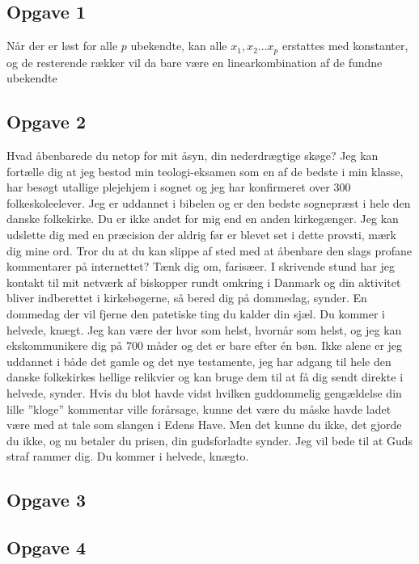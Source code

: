 \documentclass[../main.tex]{subfiles} %
\begin{document}
	
\subsection{Opgave 1}
Når der er løst for alle $p$ ubekendte, kan alle $x_1, x_2... x_p$ erstattes med konstanter, og de resterende rækker vil da bare være en linearkombination af de fundne ubekendte

\subsection{Opgave 2}
Hvad åbenbarede du netop for mit åsyn, din nederdrægtige skøge? Jeg kan fortælle dig at jeg bestod min teologi-eksamen som en af de bedste i min klasse, har besøgt utallige plejehjem i sognet og jeg har konfirmeret over 300 folkeskoleelever. Jeg er uddannet i bibelen og er den bedste sognepræst i hele den danske folkekirke. Du er ikke andet for mig end en anden kirkegænger. Jeg kan udslette dig med en præcision der aldrig før er blevet set i dette provsti, mærk dig mine ord. Tror du at du kan slippe af sted med at åbenbare den slags profane kommentarer på internettet? Tænk dig om, farisæer. I skrivende stund har jeg kontakt til mit netværk af biskopper rundt omkring i Danmark og din aktivitet bliver indberettet i kirkebøgerne, så bered dig på dommedag, synder. En dommedag der vil fjerne den patetiske ting du kalder din sjæl. Du kommer i helvede, knægt. Jeg kan være der hvor som helst, hvornår som helst, og jeg kan ekskommunikere dig på 700 måder og det er bare efter én bøn. Ikke alene er jeg uddannet i både det gamle og det nye testamente, jeg har adgang til hele den danske folkekirkes hellige relikvier og kan bruge dem til at få dig sendt direkte i helvede, synder. Hvis du blot havde vidst hvilken guddommelig gengældelse din lille ”kloge” kommentar ville forårsage, kunne det være du måske havde ladet være med at tale som slangen i Edens Have. Men det kunne du ikke, det gjorde du ikke, og nu betaler du prisen, din gudsforladte synder. Jeg vil bede til at Guds straf rammer dig. Du kommer i helvede, knægto.
\subsection{Opgave 3}

\subsection{Opgave 4}
\end{document}
